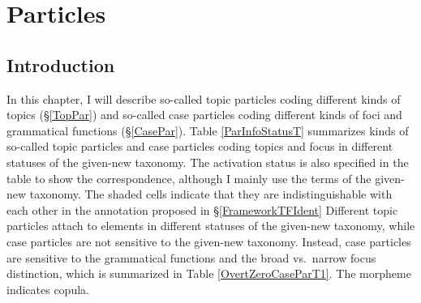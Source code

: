 \chapter{Particles}\label{Particles}



\section{Introduction}\label{ParIntro}

In this chapter, I will describe
so-called topic particles coding different kinds of topics (\S \ref{TopPar})
and
so-called case particles coding different kinds of foci and grammatical functions (\S \ref{CasePar}).
Table \ref{ParInfoStatusT} summarizes kinds of so-called topic particles and case particles
coding topics and focus in different statuses of the given-new taxonomy.
The activation status is also specified in the table to show the correspondence,
although I mainly use the terms of the given-new taxonomy.
The shaded cells indicate that they are indistinguishable with each other in the annotation proposed in \S \ref{FrameworkTFIdent}
Different topic particles attach to elements in different statuses of the given-new taxonomy,
while case particles are not sensitive to the given-new taxonomy.
Instead, case particles are sensitive to the grammatical functions and the broad vs.\ narrow focus distinction,
which is summarized in Table \ref{OvertZeroCaseParT1}.
The morpheme  indicates copula.

